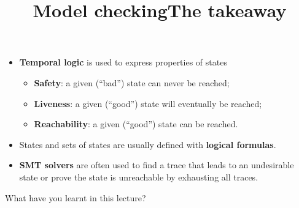\documentclass[wide]{slides}
\begin{document}
\begin{slide}
  \title{Model checking}

  \begin{itemize}

     \item \textbf{Temporal logic} is used to express properties of
       states

       \begin{itemize}

         \item \textbf{Safety}: a given (``bad'') state can never be
           reached;

         \item \textbf{Liveness}: a given (``good'') state will
           eventually be reached;

         \item \textbf{Reachability}: a given (``good'') state can be
           reached.

       \end{itemize}

     \item States and sets of states are usually defined with
       \textbf{logical formulas}.

     \item \textbf{SMT solvers} are often used to find a trace that
       leads to an undesirable state or prove the state is unreachable
       by exhausting all traces.

  \end{itemize}

\end{slide}

\begin{slide}
  \title{The takeaway}

  {\large What have you learnt in this lecture?}

\end{slide}
\end{document}
